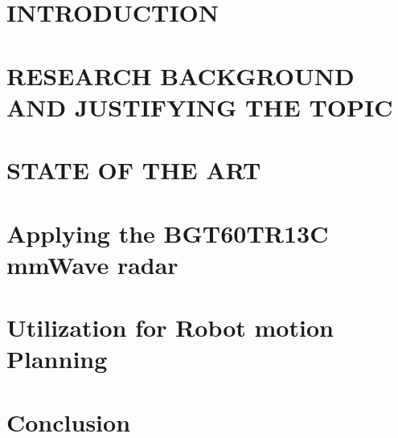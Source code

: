 \setlength{\headheight}{14.5pt}


\section*{INTRODUCTION}


\sloppypar
\raggedright 
\section{RESEARCH BACKGROUND AND JUSTIFYING THE TOPIC}



\sloppypar
\raggedright 
\section{STATE OF THE ART}





\sloppy
\section{Applying the BGT60TR13C mmWave radar}
  






\sloppy
\section{Utilization for Robot motion Planning}



\sloppy
\section{Conclusion}


% 

